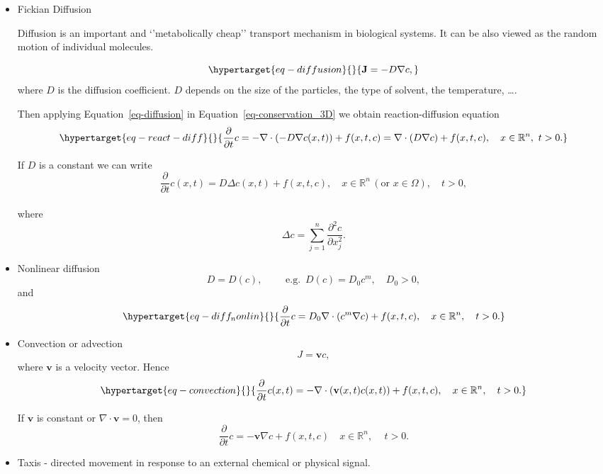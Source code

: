 \documentclass[
  letterpaper,
  DIV=11,
  numbers=noendperiod]{scrreprt}
\theoremstyle{plain}
\theoremstyle{definition}
\theoremstyle{plain}
\theoremstyle{remark}
\begin{document}
\begin{itemize}
\item
  Fickian Diffusion

  Diffusion is an important and `'metabolically cheap'' transport
  mechanism in biological systems. It can be also viewed as the random
  motion of individual molecules.

  \begin{equation}\protect\hypertarget{eq-diffusion}{}{
  {\mathbf{J}} = - D\nabla c,
  }\label{eq-diffusion}\end{equation} where \(D\) is the diffusion
  coefficient. \(D\) depends on the size of the particles, the type of
  solvent, the temperature, \ldots.

  Then applying Equation~\ref{eq-diffusion} in
  Equation~\ref{eq-conservation_3D} we obtain reaction-diffusion
  equation \begin{equation}\protect\hypertarget{eq-react-diff}{}{
  \frac{\partial}{\partial t} c =  - \nabla\cdot ( - D \nabla c(x,t))+  f(x,t ,c) = \nabla \cdot ( D \nabla c) + f(x,t ,c),
  \quad x\in \mathbb R^n, \,  \, t >0.
  }\label{eq-react-diff}\end{equation}

  If \(D\) is a constant we can write \[
  \frac{\partial}{\partial t} c(x,t) =  D \Delta c(x,t) + f(x,t ,c),
  \quad x\in \mathbb R^n \,  (\text{or } x \in \Omega), \quad t >0, 
  \]\\
  where \[
  \Delta c = \sum\limits_{j=1}^n \dfrac{\partial^2 c}{\partial x_j^2}.
  \]
\item
  Nonlinear diffusion \[
  D = D(c) , \qquad \text{ e.g. }\,   D(c)= D_0 c^m, \quad D_0 >0, 
  \] and \begin{equation}\protect\hypertarget{eq-diff_nonlin}{}{
    \frac{\partial}{\partial t} c = D_0 \nabla\cdot (c^m \nabla c) + f(x,t ,c),
  \quad x\in \mathbb R^n,  \quad t >0.
  }\label{eq-diff_nonlin}\end{equation}
\item
  Convection or advection \[ 
  J = \textbf{v} c,
  \] where \(\textbf{v}\) is a velocity vector. Hence
  \begin{equation}\protect\hypertarget{eq-convection}{}{
  \frac{\partial}{\partial t} c(x,t) = - \nabla\cdot (\textbf{v}(x,t) c(x,t))  + f(x,t ,c),
  \quad x\in \mathbb R^n,   \quad t >0. 
  }\label{eq-convection}\end{equation}

  If \(\textbf{v}\) is constant or \(\nabla \cdot \textbf{v} = 0\), then
  \[
  \frac{\partial}{\partial t} c = - \textbf{v} \nabla c  + f(x,t ,c)
  \quad x\in \mathbb R^n, \,  \quad t >0.
  \]
\item
  Taxis - directed movement in response to an external chemical or
  physical signal.


\end{itemize}
\end{document}
